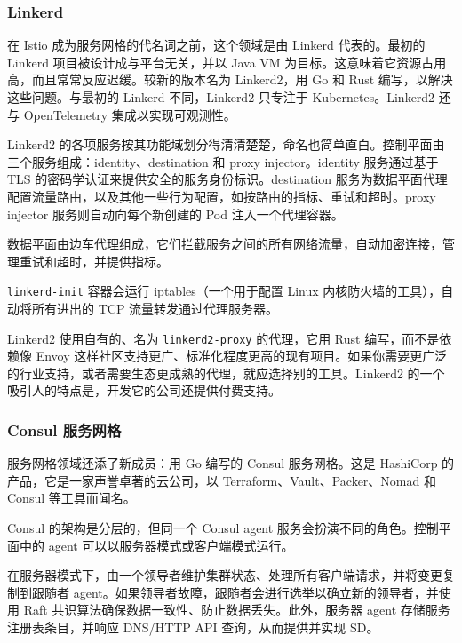 \subsubsection{Linkerd}

\label{idx:2053}
\label{idx:2054}
在 Istio 成为服务网格的代名词之前，这个领域是由 Linkerd 代表的。最初的 Linkerd 项目被设计成与平台无关，并以 Java VM 为目标。这意味着它资源占用高，而且常常反应迟缓。较新的版本名为 Linkerd2，用 Go 和 Rust 编写，以解决这些问题。与最初的 Linkerd 不同，Linkerd2 只专注于 Kubernetes。Linkerd2 还与 OpenTelemetry 集成以实现可观测性。


Linkerd2 的各项服务按其功能域划分得清清楚楚，命名也简单直白。控制平面由三个服务组成：identity、destination 和 proxy injector。identity 服务通过基于 TLS 的密码学认证来提供安全的服务身份标识。destination 服务为数据平面代理配置流量路由，以及其他一些行为配置，如按路由的指标、重试和超时。proxy injector 服务则自动向每个新创建的 Pod 注入一个代理容器。

数据平面由边车代理组成，它们拦截服务之间的所有网络流量，自动加密连接，管理重试和超时，并提供指标。

\label{idx:2055}
\texttt{linkerd-init} 容器会运行 iptables（一个用于配置 Linux 内核防火墙的工具），自动将所有进出的 TCP 流量转发通过代理服务器。

Linkerd2 使用自有的、名为 \texttt{linkerd2-proxy} 的代理，它用 Rust 编写，而不是依赖像 Envoy 这样社区支持更广、标准化程度更高的现有项目。如果你需要更广泛的行业支持，或者需要生态更成熟的代理，就应选择别的工具。Linkerd2 的一个吸引人的特点是，开发它的公司还提供付费支持。

\subsubsection{Consul 服务网格}

\label{idx:2056}
\label{idx:2057}
服务网格领域还添了新成员：用 Go 编写的 Consul 服务网格。这是 HashiCorp 的产品，它是一家声誉卓著的云公司，以 Terraform、Vault、Packer、Nomad 和 Consul 等工具而闻名。


Consul 的架构是分层的，但同一个 Consul agent 服务会扮演不同的角色。控制平面中的 agent 可以以服务器模式或客户端模式运行。

在服务器模式下，由一个领导者维护集群状态、处理所有客户端请求，并将变更复制到跟随者 agent。如果领导者故障，跟随者会进行选举以确立新的领导者，并使用 Raft 共识算法确保数据一致性、防止数据丢失。此外，服务器 agent 存储服务注册表条目，并响应 DNS/HTTP API 查询，从而提供并实现 SD。

